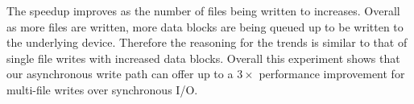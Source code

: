 The speedup improves as the number of files being written to increases. Overall
as more files are written, more data blocks are being queued up to be written
to the underlying device. Therefore the reasoning for the trends is similar to
that of single file writes with increased data blocks. Overall this experiment
shows that our asynchronous write path can offer up to a $3\times$ performance
improvement for multi-file writes over synchronous I/O.
